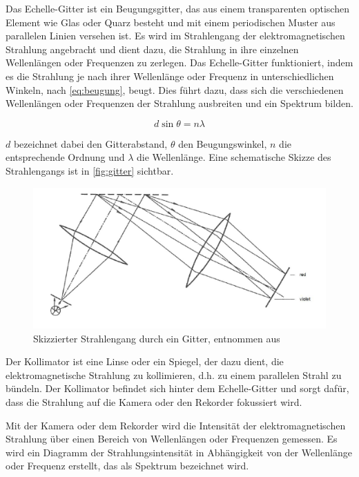 \documentclass[12pt,english,ngerman]{scrartcl}
\begin{document}
Das Echelle-Gitter ist ein Beugungsgitter, das aus einem transparenten
optischen Element wie Glas oder Quarz besteht und mit einem periodischen Muster
aus parallelen Linien versehen ist. Es wird im Strahlengang der
elektromagnetischen Strahlung angebracht und dient dazu, die Strahlung in ihre
einzelnen Wellenlängen oder Frequenzen zu zerlegen. Das Echelle-Gitter
funktioniert, indem es die Strahlung je nach ihrer Wellenlänge oder Frequenz in
unterschiedlichen Winkeln, nach \autoref{eq:beugung}, beugt. Dies führt dazu,
dass sich die verschiedenen Wellenlängen oder Frequenzen der Strahlung
ausbreiten und ein Spektrum bilden.

\begin{equation}
	d \sin{\theta} = n \lambda
	\label{eq:beugung}
\end{equation}

$d$ bezeichnet dabei den Gitterabstand, $\theta$ den Beugungswinkel, $n$ die entsprechende Ordnung und $\lambda$ die Wellenlänge.
Eine schematische Skizze des Strahlengangs ist in \autoref{fig:gitter} sichtbar.

\begin{figure}[H]
	\begin{center}
		\includegraphics[width =\textwidth]{./figures/skizze_gitter.png}
	\end{center}
	\caption[Skizzierter Strahlengang durch ein Gitter] {Skizzierter Strahlengang durch ein
		Gitter, entnommen aus~\cite{unterlagen}
	}\label{fig:gitter}
\end{figure}

Der Kollimator ist eine Linse oder ein Spiegel, der dazu dient, die
elektromagnetische Strahlung zu kollimieren, d.h. zu einem parallelen Strahl zu
bündeln. Der Kollimator befindet sich hinter dem Echelle-Gitter und sorgt
dafür, dass die Strahlung auf die Kamera oder den Rekorder fokussiert wird.

Mit der Kamera oder dem Rekorder wird die Intensität der elektromagnetischen
Strahlung über einen Bereich von Wellenlängen oder Frequenzen gemessen. Es wird
ein Diagramm der Strahlungsintensität in Abhängigkeit von der Wellenlänge oder
Frequenz erstellt, das als Spektrum bezeichnet wird.
\end{document}
